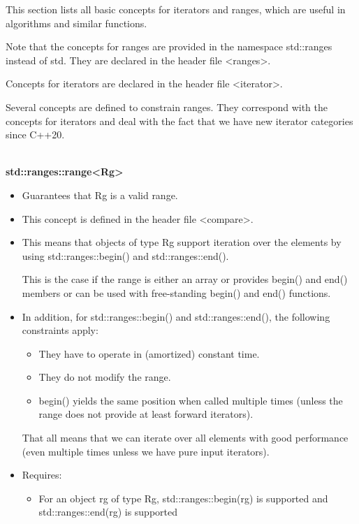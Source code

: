
This section lists all basic concepts for iterators and ranges, which are useful in algorithms and similar functions.

Note that the concepts for ranges are provided in the namespace std::ranges instead of std. They are declared in the header file <ranges>.

Concepts for iterators are declared in the header file <iterator>.


Several concepts are defined to constrain ranges. They correspond with the concepts for iterators and deal with the fact that we have new iterator categories since C++20.

\noindent
\hspace*{\fill} \\ %
\textbf{std::ranges::range<Rg>}

\begin{itemize}
\item
Guarantees that Rg is a valid range.

\item
This concept is defined in the header file <compare>.

\item
This means that objects of type Rg support iteration over the elements by using std::ranges::begin() and std::ranges::end().

This is the case if the range is either an array or provides begin() and end() members or can be used with free-standing begin() and end() functions.

\item
In addition, for std::ranges::begin() and std::ranges::end(), the following constraints apply:

\begin{itemize}
\item
They have to operate in (amortized) constant time.

\item
They do not modify the range.

\item
begin() yields the same position when called multiple times (unless the range does not provide at least forward iterators).
\end{itemize}

That all means that we can iterate over all elements with good performance (even multiple times unless we have pure input iterators).

\item
Requires:

\begin{itemize}
\item
For an object rg of type Rg, std::ranges::begin(rg) is supported and std::ranges::end(rg) is supported
\end{itemize}
\end{itemize}

